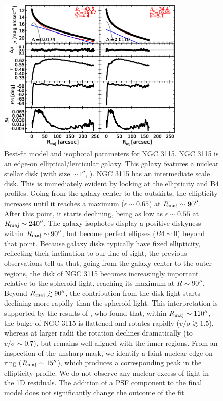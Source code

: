 \documentclass[preprint2]{emulateapj}
\newcommand{\fitfigurewidth}{0.8\textwidth}
\begin{document}
  \begin{figure}[h]
  \begin{center}
  \includegraphics[width=\fitfigurewidth]{images/n3115_1Dfit.eps}
  \caption{Best-fit model and isophotal parameters for NGC 3115.
  NGC 3115 is an edge-on elliptical/lenticular galaxy. 
  This galaxy features a nuclear stellar disk (with size $\sim 1''$, \citealt{scorzabender1995,ledo2010}).
  NGC 3115 has an intermediate scale disk.
  This is immediately evident by looking at the ellipticity and B4 profiles.
  Going from the galaxy center to the outskirts, the ellipticity increases until it reaches a maximum 
  ($\epsilon \sim 0.65$) at $R_{\rm maj} \sim 90''$. 
  After this point, it starts declining, being as low as $\epsilon \sim 0.55$ at $R_{\rm maj} \sim 240''$. 
  The galaxy isophotes display a positive diskyness within $R_{\rm maj} \sim 90''$, but become perfect ellipses 
  ($B4 \sim 0$) beyond that point.
  Because galaxy disks typically have fixed ellipticity, reflecting their inclination to our line of sight,
  the previous observations tell us that, going from the galaxy center to the outer regions,
  the disk of NGC 3115 becomes increasingly important relative to the spheroid light, reaching its maximum at $R \sim 90''$.
  Beyond $R_{\rm maj} \gtrsim 90''$, the contribution from the disk light starts declining more rapidly than the spheroid light.
  This interpretation is supported by the results of \cite{arnold2011n3115},
  who found that, within $R_{\rm maj} \sim 110''$, the bulge of NGC 3115 is flattened and rotates rapidly ($v/\sigma \gtrsim 1.5$),
  whereas at larger radii the rotation declines dramatically (to $v/\sigma \sim 0.7$), 
  but remains well aligned with the inner regions. 
  From an inspection of the unsharp mask, we identify a faint nuclear edge-on ring ($R_{\rm maj} \sim 15''$), 
  which produces a corresponding peak in the ellipticity profile. 
  We do not observe any nuclear excess of light in the 1D residuals. 
  The addition of a PSF component to the final model does not significantly change the outcome of the fit. 
  }
  \end{center}
  \end{figure}
\end{document}
